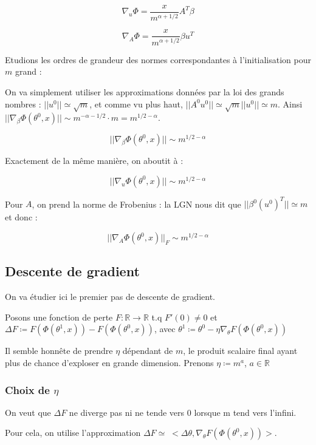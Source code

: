 \documentclass[a4paper, 11pt, french]{article}
\begin{document}
	\[\nabla_u \Phi = \frac{x}{m^{\alpha + 1/2}} A^T \beta\]

	\[\nabla_A \Phi = \frac{x}{m^{\alpha + 1/2}} \beta u^T\]
	
	Etudions les ordres de grandeur des normes correspondantes à l'initialisation pour $m$ grand :
	
	On va simplement utiliser les approximations données par la loi des grands nombres :
	 $||u^0|| \simeq \sqrt{m}$, et comme vu plus haut, 
	 $||A^0 u^0|| \simeq \sqrt{m}||u^0|| \simeq m$. Ainsi $||\nabla_{\beta} \Phi (\theta^0, x)|| \sim m^{-\alpha - 1/2} \cdot m = m^{1/2 - \alpha}$.
	 
	 \[||\nabla_{\beta} \Phi (\theta^0, x)|| \sim m^{1/2 - \alpha}\]
	 
	 Exactement de la même manière, on aboutit à :
	 
	 \[||\nabla_u \Phi (\theta^0, x)|| \sim m^{1/2 - \alpha}\]
	 
	 Pour $A$, on prend la norme de Frobenius : la LGN nous dit que $||\beta^0 (u^0)^T|| \simeq m$ et donc :
	 
	 \[||\nabla_A \Phi (\theta^0, x)||_F \sim m^{1/2 - \alpha}\]
	 
	 \subsection{Descente de gradient}
	 
	 On va étudier ici le premier pas de descente de gradient.
	 
	 Posons une fonction de perte $F : \mathbb{R} \rightarrow \mathbb{R}$ t.q $F'(0) \neq 0$ et 
	 $\Delta F \coloneqq F(\Phi(\theta^1, x)) - F(\Phi(\theta^0, x))$, avec 
	 $\theta^1 \coloneqq \theta^0 - \eta \nabla_{\theta} F(\Phi(\theta^0, x))$
	 
	 Il semble honnête de prendre $\eta$ dépendant de $m$, le produit scalaire final ayant plus de chance d'exploser en grande dimension. Prenons $\eta \coloneqq m^a$, $a \in \mathbb{R}$ \\
	 
	 \subsubsection{Choix de $\eta$}
	 
	 On veut que $\Delta F$ ne diverge pas ni ne tende vers 0 lorsque m tend vers l'infini.
	 
	 Pour cela, on utilise l'approximation 
	 $\Delta F \simeq \; < \Delta \theta, \nabla_{\theta} F(\Phi(\theta^0, x)) >$.
	 
\end{document}
